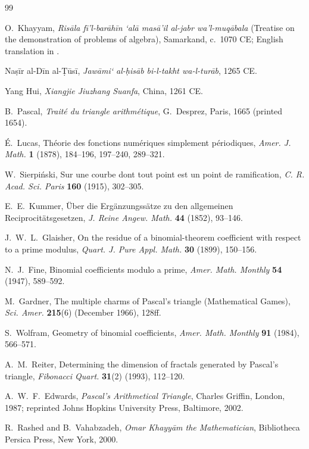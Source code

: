 \documentclass[11pt]{amsart}
\begin{document}
\begin{thebibliography}{99}

O.~Khayyam, \emph{Risāla fī'l-barāhīn `alā masā'il al-jabr wa'l-muqābala} (Treatise on the demonstration of problems of algebra), Samarkand, c.~1070 CE; English translation in \cite{rashed2000}.

Naṣīr al-Dīn al-\d{T}ūsī, \emph{Jawāmi` al-ḥisāb bi-l-takht wa-l-turāb}, 1265 CE.

Yang Hui, \emph{Xiangjie Jiuzhang Suanfa}, China, 1261 CE.

B.~Pascal, \emph{Traité du triangle arithmétique}, G.~Desprez, Paris, 1665 (printed 1654).

É.~Lucas, Théorie des fonctions numériques simplement périodiques, \emph{Amer. J. Math.} \textbf{1} (1878), 184--196, 197--240, 289--321.

W.~Sierpiński, Sur une courbe dont tout point est un point de ramification, \emph{C. R. Acad. Sci. Paris} \textbf{160} (1915), 302--305.

E.~E.~Kummer, Über die Ergänzungssätze zu den allgemeinen Reciprocitätsgesetzen, \emph{J. Reine Angew. Math.} \textbf{44} (1852), 93--146.

J.~W.~L.~Glaisher, On the residue of a binomial-theorem coefficient with respect to a prime modulus, \emph{Quart. J. Pure Appl. Math.} \textbf{30} (1899), 150--156.

N.~J.~Fine, Binomial coefficients modulo a prime, \emph{Amer. Math. Monthly} \textbf{54} (1947), 589--592.

M.~Gardner, The multiple charms of Pascal's triangle (Mathematical Games), \emph{Sci. Amer.} \textbf{215}(6) (December 1966), 128ff.

S.~Wolfram, Geometry of binomial coefficients, \emph{Amer. Math. Monthly} \textbf{91} (1984), 566--571.

A.~M.~Reiter, Determining the dimension of fractals generated by Pascal's triangle, \emph{Fibonacci Quart.} \textbf{31}(2) (1993), 112--120.

A.~W.~F.~Edwards, \emph{Pascal's Arithmetical Triangle}, Charles Griffin, London, 1987; reprinted Johns Hopkins University Press, Baltimore, 2002.

R.~Rashed and B.~Vahabzadeh, \emph{Omar Khayyām the Mathematician}, Bibliotheca Persica Press, New York, 2000.


\end{thebibliography}
\end{document}
